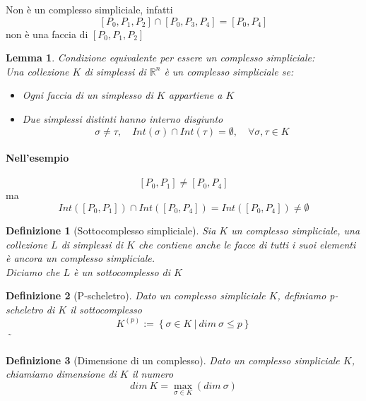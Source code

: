 \documentclass[a4paper]{report}
\newtheorem{definition}{Definizione}
\newtheorem{lemma}{Lemma}
\newcommand{\R}{\ensuremath{\mathbb{R}}}
\newcommand{\setst}[2]{\ensuremath{\left\{{#1}\ |\ {#2}\right\}}}
\begin{document}
Non è un complesso simpliciale, infatti
\[
    [P_0,P_1,P_2]\cap[P_0,P_3,P_4]=[P_0,P_4]
\]
non è una faccia di $[P_0,P_1,P_2]$
\begin{lemma}
    Condizione equivalente per essere un complesso simpliciale:\\
    Una collezione $K$ di simplessi di $\R^n$ è un complesso simpliciale se:
    \begin{itemize}
        \item Ogni faccia di un simplesso di $K$ appartiene a $K$
        \item Due simplessi distinti hanno interno disgiunto
              \[
                  \sigma\neq\tau,\quad Int(\sigma)\cap Int(\tau)=\emptyset,\quad \forall\sigma,\tau\in K
              \]
    \end{itemize}
\end{lemma}
\paragraph{Nell'esempio}
\[
    [P_0,P_1]\neq[P_0,P_4]
\]
ma
\[
    Int([P_0,P_1])\cap Int([P_0,P_4])=Int([P_0,P_4])\neq\emptyset
\]
\begin{definition}[Sottocomplesso simpliciale]
    Sia $K$ un complesso simpliciale, una collezione $L$ di simplessi di $K$ che contiene anche le facce di tutti i suoi elementi è ancora un complesso simpliciale.\\
    Diciamo che $L$ è un sottocomplesso di $K$
\end{definition}
\begin{definition}[P-scheletro]
    Dato un complesso simpliciale $K$, definiamo p-scheletro di $K$ il sottocomplesso
    \[
        K^{(p)}:=\setst{\sigma\in K}{dim\ \sigma\leq p}
    \]˜
\end{definition}
\begin{definition}[Dimensione di un complesso]
    Dato un complesso simpliciale $K$, chiamiamo dimensione di $K$ il numero
    \[
        dim\ K=\max_{\sigma\in K}(dim\ \sigma)
    \]
\end{definition}
\end{document}
